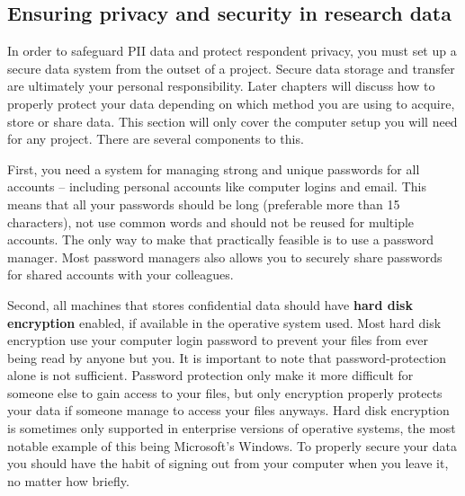 \subsection{Ensuring privacy and security in research data}

In order to safeguard PII data and protect respondent privacy,
you must set up a secure data system from the outset of a project.
Secure data storage and transfer are ultimately your personal responsibility.
Later chapters will discuss how to properly protect your data depending on
which method you are using to acquire, store or share data.
This section will only cover the computer setup you will need for any project.
There are several components to this.

First, you need a system for managing strong and unique passwords for
all accounts -- including personal accounts like computer logins and email.
This means that all your passwords should be long (preferable more than 15 characters),
not use common words and should not be reused for multiple accounts.
The only way to make that practically feasible is to use a password manager.
Most password managers also allows you to securely share passwords
for shared accounts with your colleagues.

Second, all machines that stores confidential data
should have \textbf{hard disk encryption} enabled,
if available in the operative system used.
Most hard disk encryption use your computer login password to
prevent your files from ever being read by anyone but you.
It is important to note that password-protection alone is not sufficient.
Password protection only make it more difficult for someone else to gain access to your files,
but only encryption properly protects your data if someone manage to access your files anyways.
Hard disk encryption is sometimes only supported in enterprise versions of operative systems,
the most notable example of this being Microsoft's Windows.
To properly secure your data you should have the habit of
signing out from your computer when you leave it,
no matter how briefly.

